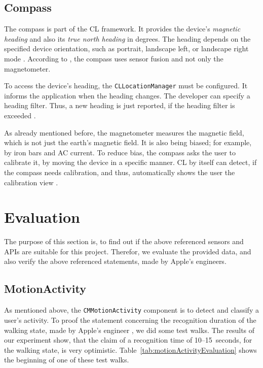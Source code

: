 \subsection{Compass}
The compass is part of the \ac{CL} framework. It provides the device's \emph{magnetic heading} and also its \emph{true north heading} in degrees. The heading depends on the specified device orientation, such as portrait, landscape left, or landscape right mode \citep{apple:ios_doc_cl}. According to \citet{apple:wwdc_2012_pham}, the compass uses sensor fusion and not only the magnetometer.

To access the device's heading, the \texttt{CLLocationManager} must be configured. It informs the application when the heading changes. The developer can specify a heading filter. Thus, a new heading is just reported, if the heading filter is exceeded \citep{apple:ios_doc_cl}.

As already mentioned before, the magnetometer measures the magnetic field, which is not just the earth's magnetic field. It is also being biased; for example, by iron bars and AC current. To reduce bias, the compass asks the user to calibrate it, by moving the device in a specific manner. \ac{CL} by itself can detect, if the compass needs calibration, and thus, automatically shows the user the calibration view \citep{apple:ios_doc_cl}.


\section{Evaluation}\label{sec:sensor_eval}
The purpose of this section is, to find out if the above referenced sensors and \acsp{API} are suitable for this project. Therefor, we evaluate the provided data, and also verify the above referenced statements, made by Apple's engineers.


\subsection{MotionActivity}
As mentioned above, the \texttt{CMMotionActivity} component is to detect and classify a user's activity. To proof the statement concerning the recognition duration of the walking state, made by Apple's engineer \citet{apple:wwdc_2014_pham}, we did some test walks. The results of our experiment show, that the claim of a recognition time of 10--15~seconds, for the walking state, is very optimistic. Table~\ref{tab:motionActivityEvaluation} shows the beginning of one of these test walks.

